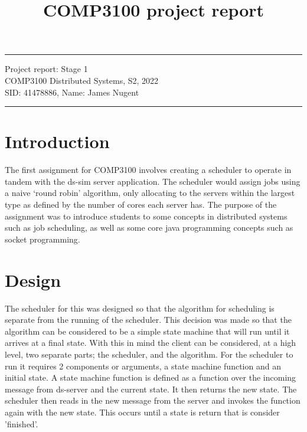 \documentclass[a4paper]{article} %
\begin{document}

\title{COMP3100 project report} %
\fancyhead[C]{}
\hrule \medskip %
\begin{minipage}{1\textwidth} %
\centering 
\large %
Project report: Stage 1\\ %
COMP3100 Distributed Systems, S2, 2022\\
\normalsize %
SID: 41478886, Name: James Nugent
\end{minipage}
\medskip\hrule %
\bigskip


\section*{Introduction}
The first assignment for COMP3100 involves creating a scheduler to operate in tandem with the ds-sim server application.
The scheduler would assign jobs using a naive `round robin' algorithm, only allocating to the servers within the largest type as defined by the number of cores each server has.
The purpose of the assignment was to introduce students to some concepts in distributed systems such as job scheduling, as well as some core java programming concepts such as socket programming.

\section*{Design}
The scheduler for this was designed so that the algorithm for scheduling is separate from the running of the scheduler.
This decision was made so that the algorithm can be considered to be a simple state machine that will run until it arrives at a final state. 
With this in mind the client can be considered, at a high level, two separate parts; the scheduler, and the algorithm.
\newline
For the scheduler to run it requires 2 components or arguments, a state machine function and an initial state. 
A state machine function is defined as a function over the incoming message from ds-server and the current state.
It then returns the new state. The scheduler then reads in the new message from the server and invokes the function again with the new state.
This occurs until a state is return that is consider 'finished'. 
\end{document}
